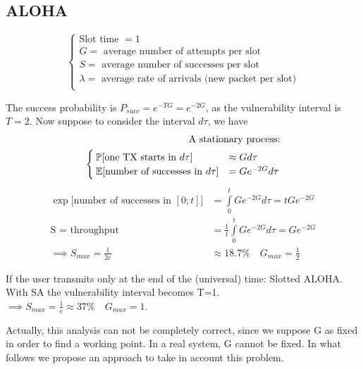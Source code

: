 \subsection{ALOHA}
\begin{equation*}
	\begin{cases}
		\text{Slot time }= 1 \\
		G = \text{ average number of attempts per slot} \\
		S = \text{ average number of successes per slot} \\
		\lambda = \text{ average rate of arrivals (new packet per slot)} \\
	\end{cases}
\end{equation*}

The success probability is $P_{succ} = e^{-T G} = e^{-2 G}$, as the vulnerability interval is $T=2$.
Now suppose to consider the interval $d\tau$, we have
\begin{equation}\begin{split}
	\text{A stationary process:} \\
	\begin{cases}
		\mathbb{P}[\text{one TX starts in $d\tau$}] &\approx G d\tau\\
		\mathbb{E}[\text{number of successes in $d\tau$}] &= G e^{-2 G} d\tau \\
	\end{cases}
	\end{split}
	\end{equation}
	\begin{equation}\begin{split}
	\exp\bigg[\text{number of successes in $[0;t]$}\bigg] &= \int\limits_0^t G e^{-2 G}d\tau = t G e^{-2 G}\\
	\text{S = throughput }&=\frac{1}{t} \int\limits_0^t G e^{-2 G}d\tau = G e^{-2 G}\\
	\implies S_{max} = \frac{1}{2e}& \approx 18.7\% \quad G_{max} = \frac{1}{2}
\end{split}\end{equation}

If the user transmits only at the end of the (universal) time: Slotted ALOHA.
With SA the vulnerability interval becomes T=1. $\implies S_{max}=\frac{1}{e} \approx 37\% \quad G_{max} = 1$.

Actually, this analysis can not be completely correct, since we suppose G as fixed in order to find a working point. In a real system, G cannot be fixed. In what follows we propose an approach to take in account this problem.

